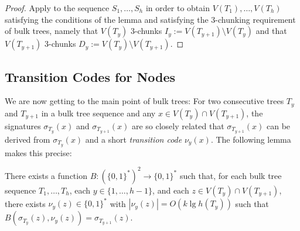 \documentclass[kpfonts]{patmorin}
\begin{document}
\begin{proof}
  Apply  to the sequence $S_1,\ldots,S_h$ in order to obtain $V(T_1),\ldots,V(T_h)$ satisfying the conditions of the lemma and satisfying the 3-chunking requirement of bulk trees, namely that $V(T_y)$ 3-chunks $I_y:=V(T_{y+1})\setminus V(T_y)$ and that $V(T_{y+1})$ 3-chunks $D_y:=V(T_y)\setminus V(T_{y+1})$.
\end{proof}

\subsection{Transition Codes for Nodes}

We are now getting to the main point of bulk trees:  For two consecutive trees $T_y$ and $T_{y+1}$ in a bulk tree sequence and any $x\in V(T_y)\cap V(T_{y+1})$, the signatures $\sigma_{T_y}(x)$ and $\sigma_{T_{y+1}}(x)$ are so closely related that $\sigma_{T_{y+1}}(x)$ can be derived from $\sigma_{T_y}(x)$ and a short \emph{transition code} $\nu_y(x)$.  The following lemma makes this precise:

\begin{lem}
  There exists a function $B:(\{0,1\}^*)^2\to\{0,1\}^*$ such that, for each bulk tree sequence $T_1,\ldots,T_h$, each $y\in\{1,\ldots,h-1\}$, and each $z\in V(T_y)\cap V(T_{y+1})$, there exists $\nu_y(z)\in\{0,1\}^*$ with $|\nu_y(z)| = O(k\lg h(T_y))$ such that $B(\sigma_{T_y}(z), \nu_y(z)) = \sigma_{T_{y+1}}(z)$.  
\end{lem}
\end{document}
